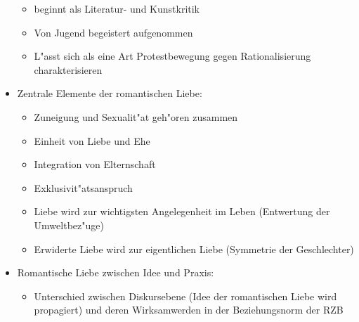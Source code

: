 \begin{itemize}
\begin{itemize}
			\item
				beginnt als Literatur- und Kunstkritik
			\item
				Von Jugend begeistert aufgenommen
			\item
				L"asst sich als eine Art Protestbewegung gegen Rationalisierung charakterisieren
		\end{itemize}
	\item
		Zentrale Elemente der romantischen Liebe:
		\begin{itemize}
			\item
				Zuneigung und Sexualit"at geh"oren zusammen
			\item
				Einheit von Liebe und Ehe
			\item
				Integration von Elternschaft
			\item
				Exklusivit"atsanspruch
			\item
				Liebe wird zur wichtigsten Angelegenheit im Leben (Entwertung der Umweltbez"uge)
			\item
				Erwiderte Liebe wird zur eigentlichen Liebe (Symmetrie der Geschlechter)
		\end{itemize}
	\item
		Romantische Liebe zwischen Idee und Praxis:
		\begin{itemize}
			\item
				Unterschied zwischen Diskursebene (Idee der romantischen Liebe wird propagiert) und deren Wirksamwerden in der Beziehungsnorm der RZB
		\end{itemize}
\end{itemize}

